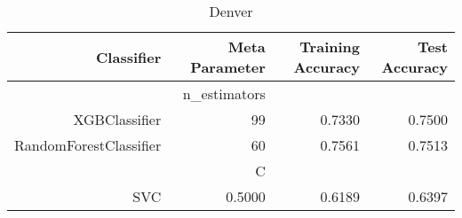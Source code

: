 
\begin{table}[H]
    \caption{Denver}
    \centering
    \begin{tabular}{|r|r|r|r|}
        \hline
        Classifier &Meta Parameter &Training Accuracy
        &Test Accuracy\\
        \hline
        &n\_estimators &\multicolumn{2}{|r|}{}\\
        \hline
        XGBClassifier &99 &0.7330 &0.7500\\
        \hline
        RandomForestClassifier &60 &0.7561 &0.7513\\
        \hline
        &C &\multicolumn{2}{|r|}{}\\
        \hline
        SVC &0.5000 &0.6189 &0.6397\\
        \hline
    \end{tabular}
\end{table}
